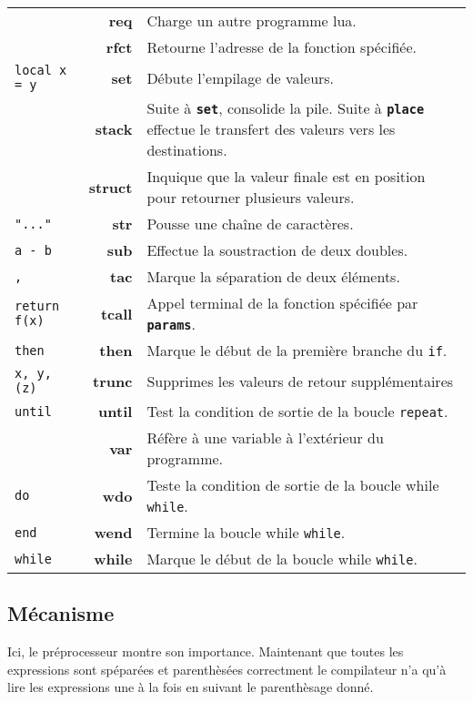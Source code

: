 \documentclass{article}
\begin{document}
\begin{longtable}{p{2cm} r p{12cm}}
   & \textbf{req} & Charge un autre programme lua.\\
  & \textbf{rfct} & Retourne l'adresse de la fonction spécifiée.\\
  {\lstset{style=lua}\lstinline$local x = y$} & \textbf{set} & Débute l'empilage de valeurs.\\
  & \textbf{stack} & Suite à \texttt{\textbf{set}}, consolide la pile. Suite à \texttt{\textbf{place}} effectue le transfert des valeurs vers les destinations.\\
  & \textbf{struct} & Inquique que la valeur finale est en position pour retourner plusieurs valeurs.\\
  {\lstset{style=lua}\lstinline$"..."$} & \textbf{str} & Pousse une chaîne de caractères.\\
  {\lstinline$a - b$} & \textbf{sub} & Effectue la soustraction de deux doubles.\\
  {\lstset{style=lua}\lstinline$,$} & \textbf{tac} & Marque la séparation de deux éléments.\\
  {\lstset{style=lua}\lstinline$return f(x)$} & \textbf{tcall} & Appel terminal de la fonction spécifiée par \texttt{\textbf{params}}.\\
  {\lstset{style=lua}\lstinline$then$} & \textbf{then} & Marque le début de la première branche du {\lstset{style=lua}\lstinline$if$}.\\
  {\lstset{style=lua}\lstinline$x, y, (z)$} & \textbf{trunc} & Supprimes les valeurs de retour supplémentaires\\
  {\lstset{style=lua}\lstinline$until$} & \textbf{until} & Test la condition de sortie de la boucle {\lstset{style=lua}\lstinline$repeat$}.\\
  {\lstset{style=lua}\lstinline$$} & \textbf{var} & Réfère à une variable à l'extérieur du programme.\\
  {\lstset{style=lua}\lstinline$do$} & \textbf{wdo} & Teste la condition de sortie de la boucle while {\lstset{style=lua}\lstinline$while$}.\\
  {\lstset{style=lua}\lstinline$end$} & \textbf{wend} & Termine la boucle while {\lstset{style=lua}\lstinline$while$}.\\
  {\lstset{style=lua}\lstinline$while$} & \textbf{while} & Marque le début de la boucle while {\lstset{style=lua}\lstinline$while$}.\\
  
\end{longtable}

\newpage
\subsection{Mécanisme}
Ici, le préprocesseur montre son importance. Maintenant que toutes les expressions sont spéparées et parenthèsées correctment le compilateur n'a qu'à lire les expressions une à la fois en suivant le parenthèsage donné.
\end{document}
